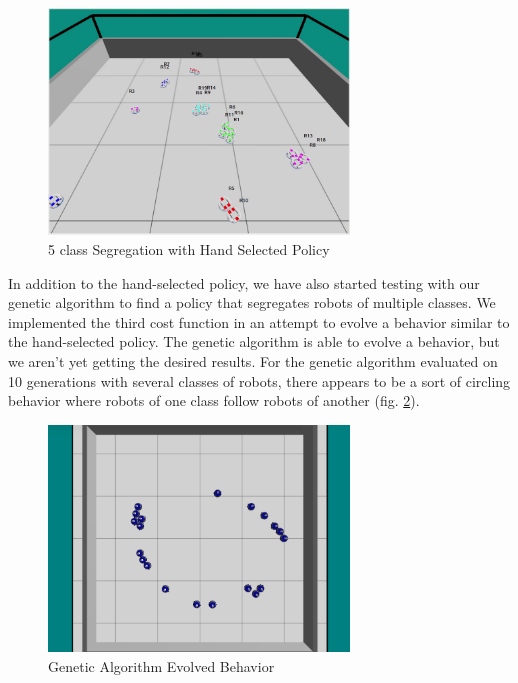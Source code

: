 \documentclass[conference]{IEEEtran}
\begin{document}
  \begin{figure}
    \centering
    \includegraphics[width=8cm]{handtuned-5class.png}
    \caption{5 class Segregation with Hand Selected Policy}
    \label{fig:handtuned-5class}
  \end{figure}
  
In addition to the hand-selected policy, we have also started testing with our genetic algorithm to find a policy that segregates robots of multiple classes.  We implemented the third cost function in an attempt to evolve a behavior similar to the hand-selected policy.  The genetic algorithm is able to evolve a behavior, but we aren't yet getting the desired results.  For the genetic algorithm evaluated on 10 generations with several classes of robots, there appears to be a sort of circling behavior where robots of one class follow robots of another (fig. \ref{fig:ga-multiclass}).

  \begin{figure}
    \centering
    \includegraphics[width=8cm]{evolved_multiclass.png}
    \caption{Genetic Algorithm Evolved Behavior}
    \label{fig:ga-multiclass}
  \end{figure}
  



\end{document}
